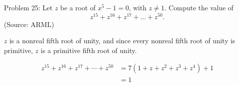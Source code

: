 Problem 25: Let $z$ be a root of $x^5 - 1 = 0$, with $z \neq 1$. Compute the value of \[z^{15} + z^{16} + z^{17} + \dots + z^{50}.\] (Source: ARML)

$z$ is a nonreal fifth root of unity, and since every nonreal fifth root of unity is primitive, $z$ is a primitive fifth root of unity.

\begin{align*}
z^{15} + z^{16} + z^{17} + \cdots + z^{50} &= 7(1 + z + z^2 + z^3 + z^4) + 1 \\
&= \boxed{1}
\end{align*}
